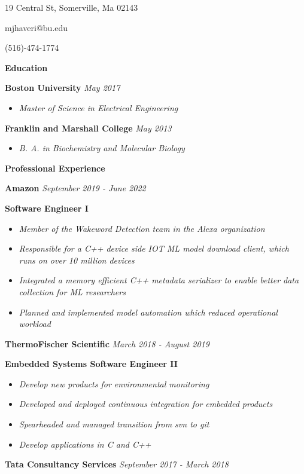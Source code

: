 \documentclass[8pt]{extarticle}
\begin{document}
\begin{center} 

19 Central St, Somerville, Ma 02143

mjhaveri@bu.edu 

(516)-474-1774 
\end{center} 
\begin{changemargin}{-0.8cm}{0.0cm}
\textbf{Education}
\end{changemargin}
\vspace*{-0.4cm}
\makebox[\linewidth]{\rule{17cm}{0.4pt}}
\textbf{Boston University} \textit{May 2017}
\begin{itemize}
\item \textit{Master of Science in Electrical Engineering}
\end{itemize}
\textbf{Franklin and Marshall College} \textit{May 2013}
\begin{itemize}
\item \textit{B. A. in Biochemistry and Molecular Biology }

\end{itemize}
\begin{changemargin}{-0.8cm}{0.0cm}
	\textbf{Professional Experience}
\end{changemargin}
\vspace*{-0.4cm}
\makebox[\linewidth]{\rule{17cm}{0.4pt}}
\textbf{Amazon} \hfill\textit{September 2019 - June 2022}

{\tiny }
\textbf{Software Engineer I}
\begin{itemize}
	\item \textit{Member of the Wakeword Detection team in the Alexa organization}
	\item \textit{Responsible for a C++ device side IOT ML model download client, which runs on over 10 million devices}
	\item \textit{Integrated a memory efficient C++ metadata serializer to enable better data collection for ML researchers}
	\item \textit{Planned and implemented model automation which reduced operational workload}
\end{itemize}
\textbf{ThermoFischer Scientific} \hfill\textit{March 2018 - August 2019}

{\tiny }
\textbf{Embedded Systems Software Engineer II}
\begin{itemize}
	\item \textit{Develop new products for environmental monitoring}
	\item \textit{Developed and deployed continuous integration for embedded products}
	\item \textit{Spearheaded and managed transition from svn to git}
	\item \textit{Develop applications in C and C++}
\end{itemize}
\textbf{Tata Consultancy Services} \hfill\textit{September 2017 - March 2018}
\end{document}
